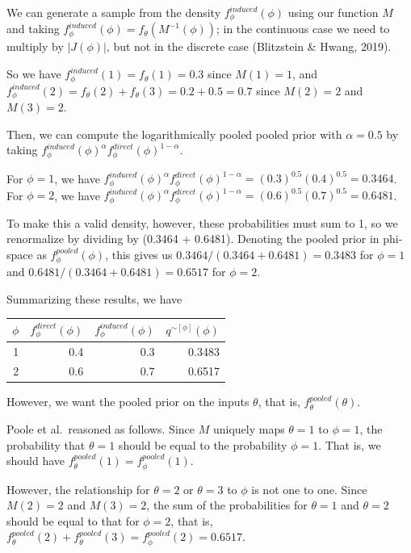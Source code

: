 \documentclass[12pt,twoside]{smiththesis}
\begin{document}
We can generate a sample from the density \(f_\phi^{induced}(\phi)\) using our function \(M\) and taking \(f_\phi^{induced}(\phi) = f_\theta(M^{-1}(\phi))\); in the continuous case we need to multiply by \(|J(\phi)|\), but not in the discrete case (Blitzstein \& Hwang, 2019).

So we have \(f_\phi^{induced}(1) = f_\theta(1) = 0.3\) since \(M(1)=1\), and \(f_\phi^{induced}(2) = f_\theta(2) + f_\theta(3) = 0.2 + 0.5=0.7\) since \(M(2) = 2\) and \(M(3)=2\).

Then, we can compute the logarithmically pooled pooled prior with \(\alpha=0.5\) by taking \(f_\phi^{induced}(\phi)^{\alpha} f_\phi^{direct}(\phi)^{1-\alpha}\).

For \(\phi = 1\), we have \(f_\phi^{induced}(\phi)^{\alpha} f_\phi^{direct}(\phi)^{1-\alpha} = (0.3)^{0.5}(0.4)^{0.5} = 0.3464\).
For \(\phi = 2\), we have \(f_\phi^{induced}(\phi)^{\alpha} f_\phi^{direct}(\phi)^{1-\alpha} = (0.6)^{0.5}(0.7)^{0.5} = 0.6481\).

To make this a valid density, however, these probabilities must sum to 1, so we renormalize by dividing by (0.3464 + 0.6481). Denoting the pooled prior in phi-space as \(f_\phi^{pooled}(\phi)\), this gives us
\(0.3464 / (0.3464 + 0.6481) = 0.3483\) for \(\phi =1\) and \(0.6481 / (0.3464 + 0.6481) =0.6517\) for \(\phi=2\).

Summarizing these results, we have
\begin{table}[H]
\centering
\begin{tabular}[t]{r|r|r|r}
\hline
$\phi$ & $f_\phi^{direct}(\phi)$ & $f_\phi^{induced}(\phi)$ & $q^{\sim[\phi]}(\phi)$\\
\hline
1 & 0.4 & 0.3 & 0.3483\\
\hline
2 & 0.6 & 0.7 & 0.6517\\
\hline
\end{tabular}
\end{table}
However, we want the pooled prior on the inputs \(\theta\), that is, \(f_\theta^{pooled}(\theta)\).

Poole et al.~reasoned as follows. Since \(M\) uniquely maps \(\theta=1\) to \(\phi =1\), the probability that \(\theta=1\) should be equal to the probability \(\phi = 1\). That is, we should have \(f_\theta^{pooled}(1) = f_\phi^{pooled}(1)\).

However, the relationship for \(\theta=2\) or \(\theta=3\) to \(\phi\) is not one to one. Since \(M(2)=2\) and \(M(3)=2\), the sum of the probabilities for \(\theta=1\) and \(\theta=2\) should be equal to that for \(\phi=2\), that is, \(f_\theta^{pooled}(2) + f_\theta^{pooled}(3) = f_\phi^{pooled}(2) = 0.6517\).
\end{document}
